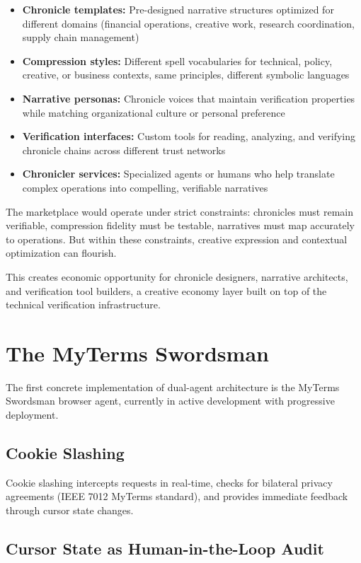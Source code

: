 \documentclass[11pt,a4paper]{article}
\theoremstyle{definition}
\begin{document}
\begin{itemize}
    \item \textbf{Chronicle templates:} Pre-designed narrative structures optimized for different domains (financial operations, creative work, research coordination, supply chain management)
    \item \textbf{Compression styles:} Different spell vocabularies for technical, policy, creative, or business contexts, same principles, different symbolic languages
    \item \textbf{Narrative personas:} Chronicle voices that maintain verification properties while matching organizational culture or personal preference
    \item \textbf{Verification interfaces:} Custom tools for reading, analyzing, and verifying chronicle chains across different trust networks
    \item \textbf{Chronicler services:} Specialized agents or humans who help translate complex operations into compelling, verifiable narratives
\end{itemize}

The marketplace would operate under strict constraints: chronicles must remain verifiable, compression fidelity must be testable, narratives must map accurately to operations. But within these constraints, creative expression and contextual optimization can flourish.

This creates economic opportunity for chronicle designers, narrative architects, and verification tool builders, a creative economy layer built on top of the technical verification infrastructure.

\section{The MyTerms Swordsman}

The first concrete implementation of dual-agent architecture is the MyTerms Swordsman browser agent, currently in active development with progressive deployment.

\subsection{Cookie Slashing}

Cookie slashing intercepts requests in real-time, checks for bilateral privacy agreements (IEEE 7012 MyTerms standard), and provides immediate feedback through cursor state changes.

\subsection{Cursor State as Human-in-the-Loop Audit}
\end{document}
